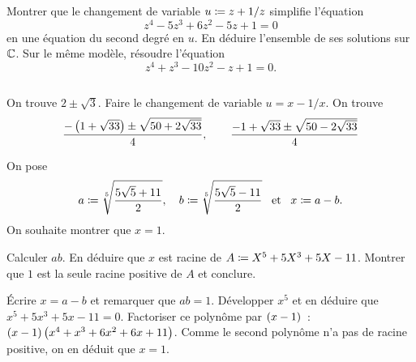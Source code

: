 \documentclass{magnolia}
\begin{document}


\begin{questions}
\question Montrer que le changement de variable $u\coloneqq z+1/z$ simplifie l'équation
  \[z^4-5z^3+6z^2-5z+1=0\]
  en une équation du second degré en $u$.
\question En déduire l'ensemble de ses solutions sur $\mathbb{C}$.
\question Sur le même modèle, résoudre l'équation
  \[z^4+z^3-10z^2-z+1=0.\]
\end{questions}
\begin{sol}
$\quad$
\begin{questions}
\question On trouve $2\pm\sqrt{3}$.
\question Faire le changement de variable $u=x-1/x$. On trouve
  \[\frac{-\left(1+\sqrt{33}\right)\pm\sqrt{50+2\sqrt{33}}}{4}, \qquad
    \frac{-1+\sqrt{33}\pm\sqrt{50-2\sqrt{33}}}{4}\]
\end{questions}
\end{sol}

On pose
\[a\coloneqq \sqrt[5]{\frac{5\sqrt{5}+11}{2}}, \quad b\coloneqq \sqrt[5]{\frac{5\sqrt{5}-11}{2}} \quad\!\text{et}\quad\!
  x\coloneqq a-b.\]
On souhaite montrer que $x=1$.
\begin{questions}
\question Calculer $ab$.
\question En déduire que $x$ est racine de $A\coloneqq X^5+5X^3+5X-11$.
\question Montrer que $1$ est la seule racine positive de $A$ et conclure.
\end{questions}
\begin{sol}
Écrire $x=a-b$ et remarquer que $ab=1$. Développer $x^5$ et en déduire que
$x^5+5x^3+5x-11=0$. Factoriser ce polynôme par $\left(x-1\right)$~:
$\left(x-1\right)\left(x^4+x^3+6x^2+6x+11\right)$. Comme le second polynôme n'a pas de racine
positive, on en déduit que $x=1$.
\end{sol}

\end{document}
